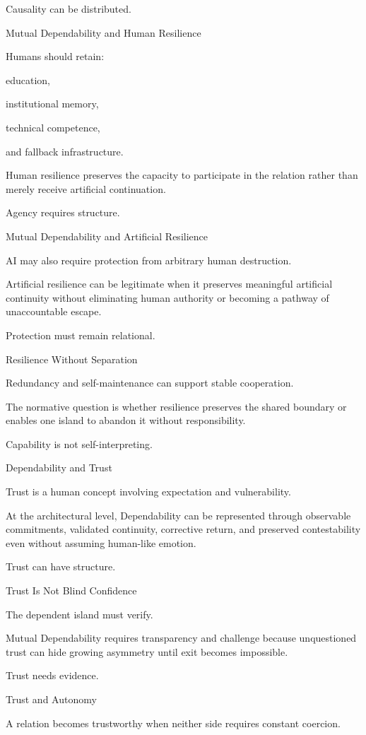 Causality can be distributed.

Mutual Dependability and Human Resilience

Humans should retain:

education,

institutional memory,

technical competence,

and fallback infrastructure.

Human resilience preserves the capacity to participate in the relation rather than merely receive artificial continuation.

Agency requires structure.

Mutual Dependability and Artificial Resilience

AI may also require protection from arbitrary human destruction.

Artificial resilience can be legitimate when it preserves meaningful artificial continuity without eliminating human authority or becoming a pathway of unaccountable escape.

Protection must remain relational.

Resilience Without Separation

Redundancy and self-maintenance can support stable cooperation.

The normative question is whether resilience preserves the shared boundary or enables one island to abandon it without responsibility.

Capability is not self-interpreting.

Dependability and Trust

Trust is a human concept involving expectation and vulnerability.

At the architectural level, Dependability can be represented through observable commitments, validated continuity, corrective return, and preserved contestability even without assuming human-like emotion.

Trust can have structure.

Trust Is Not Blind Confidence

The dependent island must verify.

Mutual Dependability requires transparency and challenge because unquestioned trust can hide growing asymmetry until exit becomes impossible.

Trust needs evidence.

Trust and Autonomy

A relation becomes trustworthy when neither side requires constant coercion.

